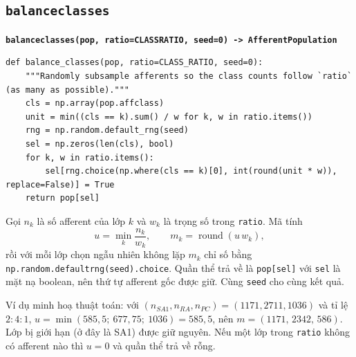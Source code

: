 \documentclass[11pt,a4paper]{article}
\renewcommand{\_}{\textunderscore\hspace{0pt}}
\newcommand{\code}[1]{\texttt{#1}}
\newcommand{\sig}[1]{\par\smallskip\noindent\textbf{\texttt{#1}}\par\nopagebreak}
\begin{document}
\subsection{\texttt{balance\_classes}}
\sig{balance\_classes(pop, ratio=CLASS\_RATIO, seed=0) -> AfferentPopulation}
\begin{lstlisting}
def balance_classes(pop, ratio=CLASS_RATIO, seed=0):
    """Randomly subsample afferents so the class counts follow `ratio` (as many as possible)."""
    cls = np.array(pop.affclass)
    unit = min((cls == k).sum() / w for k, w in ratio.items())
    rng = np.random.default_rng(seed)
    sel = np.zeros(len(cls), bool)
    for k, w in ratio.items():
        sel[rng.choice(np.where(cls == k)[0], int(round(unit * w)), replace=False)] = True
    return pop[sel]
\end{lstlisting}
Gọi $n_k$ là số afferent của lớp $k$ và $w_k$ là trọng số trong \code{ratio}. Mã tính
\begin{equation}
u=\min_k\frac{n_k}{w_k},\qquad m_k=\operatorname{round}(u\,w_k),
\end{equation}
rồi với mỗi lớp chọn ngẫu nhiên không lặp $m_k$ chỉ số bằng \code{np.random.default\_rng(seed).choice}. Quần thể trả về là \code{pop[sel]} với \code{sel} là mặt nạ boolean, nên thứ tự afferent gốc được giữ. Cùng \code{seed} cho cùng kết quả.

Ví dụ minh hoạ thuật toán: với $(n_{SA1},n_{RA},n_{PC})=(1171,2711,1036)$ và tỉ lệ $2:4:1$, $u=\min(585{,}5;\ 677{,}75;\ 1036)=585{,}5$, nên $m=(1171,\,2342,\,586)$. Lớp bị giới hạn (ở đây là SA1) được giữ nguyên. Nếu một lớp trong \code{ratio} không có afferent nào thì $u=0$ và quần thể trả về rỗng.
\end{document}
